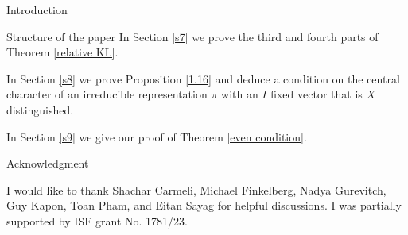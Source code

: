 \documentclass[12pt]{article}
\newcommand{\<}{\langle}
\renewcommand{\>}{\rangle}
\theoremstyle{plain}
\theoremstyle{definition}
\begin{document}
\begin{section}{Introduction}
\begin{subsection}{Structure of the paper}
In Section \ref{s7} we prove the third and fourth parts of Theorem \ref{relative KL}.

In Section \ref{s8} we prove Proposition \ref{1.16} and deduce a condition on the central character of an irreducible representation $\pi$ with an $I$ fixed vector that is $X$ distinguished.

In Section \ref{s9} we give our proof of  Theorem \ref{even condition}.

\end{subsection}

\begin{subsection}{Acknowledgment}

I would like to thank Shachar Carmeli, Michael Finkelberg, Nadya Gurevitch, Guy Kapon, Toan Pham, and Eitan Sayag for helpful discussions. I was partially supported by ISF grant No. 1781/23.

\end{subsection}

\end{section}
\end{document}
